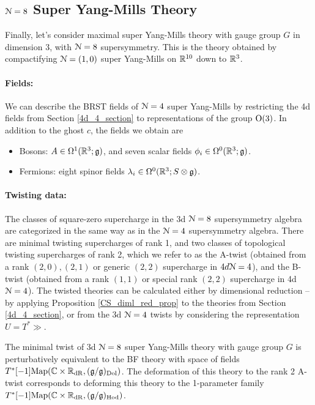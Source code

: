 \documentclass[10pt, oneside]{article}
\begin{document}
\subsection{\texorpdfstring{$\mathcal N = 8$}{N=8} Super Yang-Mills Theory} \label{3d_8_section}
Finally, let's consider maximal super Yang-Mills theory with gauge group $G$ in dimension 3, with $\mathcal{N}=8$ supersymmetry.  This is the theory obtained by compactifying $\mathcal{N}=(1,0)$ super Yang-Mills on $\mathbb R^{10}$ down to $\mathbb R^3$.

\vspace{-10pt}
\paragraph{Fields:} We can describe the BRST fields of $\mathcal{N}=4$ super Yang-Mills by restricting the 4d fields from Section \ref{4d_4_section} to representations of the group $\mathrm{O}(3)$.  In addition to the ghost $c$, the fields we obtain are
\begin{itemize}
 \item Bosons: $A \in \Omega^1(\mathbb R^3; \mathfrak{g})$, and seven scalar fields $\phi_i \in \Omega^0(\mathbb R^3; \mathfrak{g})$.
 \item Fermions: eight spinor fields $\lambda_i \in \Omega^0(\mathbb R^3; S \otimes \mathfrak{g})$.
\end{itemize}

\vspace{-10pt}
\paragraph{Twisting data:}
The classes of square-zero supercharge in the 3d $\mathcal{N}=8$ supersymmetry algebra are categorized in the same way as in the $\mathcal{N}=4$ supersymmetry algebra.  There are minimal twisting supercharges of rank 1, and two classes of topological twisting supercharges of rank 2, which we refer to as the A-twist (obtained from a rank $(2,0), (2,1)$ or generic $(2,2)$ supercharge in $4d \mathcal{N}=4$), and the B-twist (obtained from a rank $(1,1)$ or special rank $(2,2)$ supercharge in 4d $\mathcal{N}=4$).  The twisted theories can be calculated either by dimensional reduction -- by applying Proposition \ref{CS_diml_red_prop} to the theories from Section \ref{4d_4_section}, or from the 3d $\mathcal{N}=4$ twists by considering the representation $U = T^*\gg$.

\begin{theorem} 
The minimal twist of 3d $\mathcal{N}=8$ super Yang-Mills theory with gauge group $G$ is perturbatively equivalent to the BF theory with space of fields $T^*[-1]\mathrm{Map}(\mathbb C \times \mathbb R_{\mathrm{dR}}, (\mathfrak{g}/\mathfrak{g})_{\mathrm{Dol}})$. The deformation of this theory to the rank 2 A-twist corresponds to deforming this theory to the 1-parameter family $T^*[-1]\mathrm{Map}(\mathbb C \times \mathbb R_{\mathrm{dR}}, (\mathfrak{g}/\mathfrak{g})_{\mathrm{Hod}})$.
\end{theorem}
\end{document}
